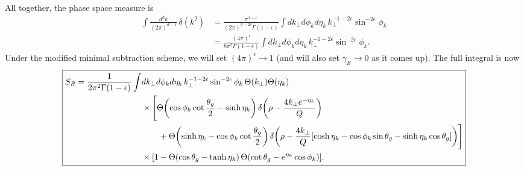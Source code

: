 \documentclass[11pt,twoside,reqno]{amsart}
\theoremstyle{plain}
\theoremstyle{remark}
\theoremstyle{definition}
\theoremstyle{remark}
\theoremstyle{definition}
\theoremstyle{definition}
\begin{document}
	All together, the phase space measure is
	\begin{equation}
	\begin{aligned}
		\int \frac{d^d k}{(2\pi)^{d-1}}\,\delta(k^2) &= \frac{\pi^{1-\epsilon}}{(2\pi)^{3-2\epsilon}\Gamma(1 - \epsilon)}\int dk_\perp d\phi_k d\eta_k \, k_\perp^{-1-2\epsilon} \sin^{-2\epsilon}\phi_k \\
		&= \frac{(4\pi)^\epsilon}{8\pi^2 \Gamma(1-\epsilon)} \int dk_\perp d\phi_k d\eta_k\,k_\perp^{-1-2\epsilon} \sin^{-2\epsilon}\phi_k.
	\end{aligned}
	\end{equation}
	Under the modified minimal subtraction scheme, we will set $(4\pi)^\epsilon \to 1$ (and will also set $\gamma_E \to 0$ as it comes up). The full integral is now
	\begin{equation}
	\boxed{
	\begin{aligned}
		S_R = \frac{1}{2\pi^2\Gamma(1 - \epsilon)} \int& dk_\perp d\phi_k d\eta_k\, k_\perp^{-1-2\epsilon} \sin^{-2\epsilon}\phi_k \, \Theta(k_\perp)\Theta(\eta_k) \\
		&\times \Bigg[ \Theta\qty(\cos\phi_k\cot\frac{\theta_g}{2} - \sinh\eta_k)\,\delta\qty(\rho - \frac{4 k_\perp e^{-\eta_k}}{Q}) \\
			&\qquad+ \Theta\qty(\sinh\eta_k - \cos\phi_k\cot\frac{\theta_g}{2})\, \delta\qty(\rho - \frac{4 k_\perp}{Q}\qty[\cosh\eta_k - \cos\phi_k\sin\theta_g - \sinh\eta_k\cos\theta_g])\Bigg] \\
			&\times \qty[1 - \Theta(\cos\theta_g - \tanh\eta_k)\,\Theta\qty(\cot\theta_g - e^{\eta_k}\cos\phi_k)].
	\end{aligned}
	}
	\end{equation}
\end{document}
